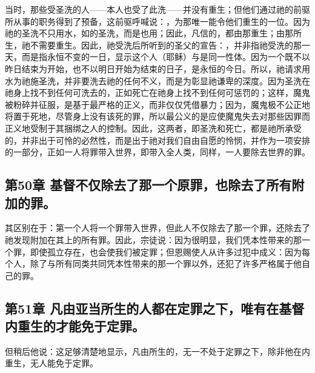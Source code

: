 当时，那些受圣洗的人——本人也受了此洗——并没有重生；但他们通过祂的前驱所从事的职务得到了预备，这前驱呼喊说：，为那唯一能令他们重生的一位。因为祂的圣洗不只用水，如的圣洗，而是也用；因此，凡信的，都由那重生；由那所生，祂不需要重生。因此，祂受洗后所听到的圣父的宣告：，并非指祂受洗的那一天，而是指永恒不变的一日，显示这个人（耶稣）与是同一性体。因为一个既不以昨日结束为开始，也不以明日开始为结束的日子，是永恒的今日。所以，祂请求用水为祂施圣洗，并非要洗去祂的任何不义，而是为彰显祂谦卑的深度。因为圣洗在祂身上找不到任何可洗去的，正如死亡在祂身上找不到任何可惩罚的；这样，魔鬼被粉碎并征服，是基于最严格的正义，而非仅仅凭借暴力；因为，魔鬼极不公正地将置于死地，尽管身上没有该死的罪，所以最公义的是应使魔鬼失去对那些因罪而正义地受制于其捆绑之人的控制。因此，这两者，即圣洗和死亡，都是祂所承受的，并非出于可怜的必然性，而是出于祂对我们自由自愿的怜悯，并作为一项安排的一部分，正如一人将罪带入世界，即带入全人类，同样，一人要除去世界的罪。\par


\subsection{第50章 基督不仅除去了那一个原罪，也除去了所有附加的罪。}

其区别在于：第一个人将一个罪带入世界，但此人不仅除去了那一个罪，还除去了祂发现附加在其上的所有罪。因此，宗徒说：因为很明显，我们凭本性带来的那一个罪，即使孤立存在，也会使我们被定罪；但恩赐使人从许多过犯中成义：因为每个人，除了与所有同类共同凭本性带来的那一个罪以外，还犯了许多严格属于他自己的罪。\par


\subsection{第51章 凡由亚当所生的人都在定罪之下，唯有在基督内重生的才能免于定罪。}

但稍后他说：这足够清楚地显示，凡由所生的，无一不处于定罪之下，除非他在内重生，无人能免于定罪。\par

